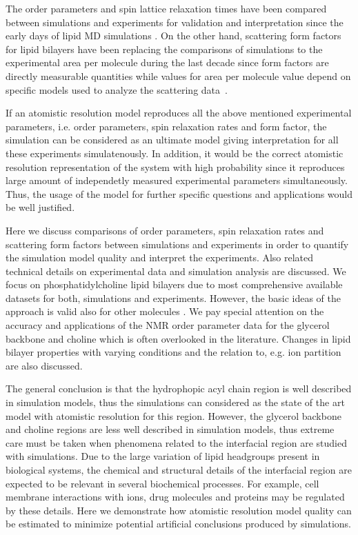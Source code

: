 \documentclass[aps,prl,superscriptaddress,twocolumn]{revtex4}
\begin{document}
The order parameters and spin lattice relaxation times have been compared between simulations
and experiments for validation and interpretation since the early days of lipid MD simulations \cite{ploeg82,pastor88}.
On the other hand, scattering form factors for lipid bilayers have been replacing the 
comparisons of simulations to the experimental area per molecule during the last decade
since form factors are directly measurable quantities while values for area per molecule value depend on
specific models used to analyze the scattering data~\cite{nagle00}.

If an atomistic resolution model reproduces all the above mentioned experimental parameters,
i.e. order parameters, spin relaxation rates and form factor, the simulation can be considered
as an ultimate model giving interpretation for all these experiments simulatenously.
In addition, it would be the correct atomistic resolution representation of the system with high
probability since it reproduces large amount of independetly measured experimental parameters 
simultaneously. Thus, the usage of the model for further specific questions and applications would be well justified.

Here we discuss comparisons of order parameters, spin relaxation rates
and scattering form factors between simulations and experiments in order to quantify the 
simulation model quality and interpret the experiments. Also related technical details on experimental
data and simulation analysis are discussed. We focus on phosphatidylcholine lipid
bilayers due to most comprehensive available datasets for both, simulations and experiments.
However, the basic ideas of the approach is valid also for other molecules \cite{wohlgemuth80,kapla12,pan12,kucerka12,nowacka13,pan14,boscia14,ferreira14}. 
We pay special attention on the accuracy and applications of the NMR order parameter data 
for the glycerol backbone and choline which is often overlooked in the literature.
Changes in lipid bilayer properties with varying conditions and the relation
to, e.g. ion partition are also discussed.

 
The general conclusion is that the hydrophopic acyl chain region is well described
in simulation models, thus the simulations can considered as the state of the art model
with atomistic resolution for this region. However, the glycerol backbone and choline regions are 
less well described in simulation models, thus extreme care must be taken when phenomena
related to the interfacial region are studied with simulations. Due to the large variation of lipid 
headgroups present in biological systems, the chemical and structural details of the interfacial
region are expected to be relevant in several biochemical processes. For example, 
cell membrane interactions with ions, drug molecules and proteins may be regulated by these
details. Here we demonstrate how atomistic resolution model quality can be estimated to minimize 
potential artificial conclusions produced by simulations.
\end{document}
